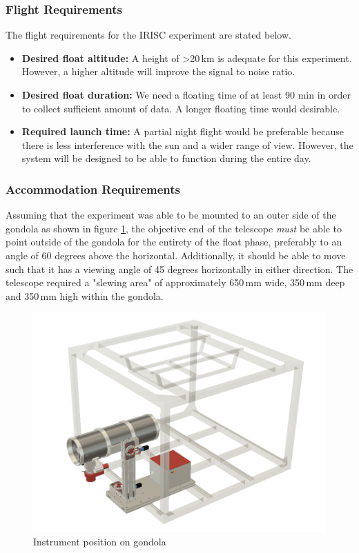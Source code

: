 \subsubsection{Flight Requirements}
The flight requirements for the IRISC experiment are stated below.
\begin{itemize}
	\item \textbf{Desired float altitude:} A height of >20\,km is adequate for this experiment. However, a higher altitude will improve the signal to noise ratio.
	\item \textbf{Desired float duration:} We need a floating time of at least 90 min in order to collect sufficient amount of data. A longer floating time would desirable.
	\item \textbf{Required launch time:} A partial night flight would be preferable because there is less interference with the sun and a wider range of view. However, the system will be designed to be able to function during the entire day.
\end{itemize}

\subsubsection{Accommodation Requirements}

Assuming that the experiment was able to be mounted to an outer side of the gondola as shown in figure \ref{accomrec}, the objective end of the telescope \textit{must} be able to point outside of the gondola for the entirety of the float phase, preferably to an angle of 60 degrees above the horizontal. Additionally, it should be able to move such that it has a viewing angle of 45 degrees horizontally in either direction. The telescope required a "slewing area" of approximately 650\,mm wide, 350\,mm deep and 350\,mm high within the gondola.

\begin{figure}[H]
	\centering
	\includegraphics[width=0.9\linewidth]{4-experiment-design/img/mechanical/ebox.png}
	\caption{Instrument position on gondola}
	\label{accomrec}
\end{figure}
